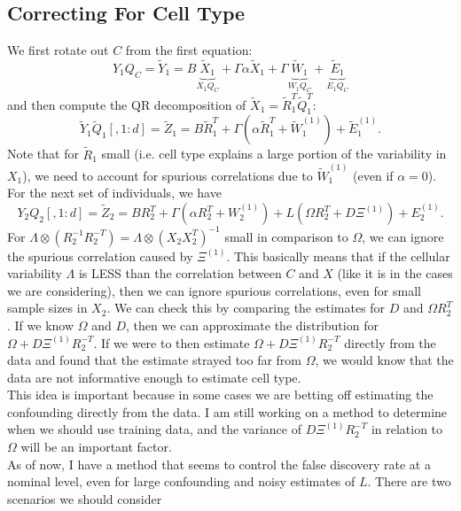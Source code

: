 \documentclass{article}
\begin{document}
\subsection*{Correcting For Cell Type}
We first rotate out $C$ from the first equation:
\[
Y_1Q_C = \tilde{Y}_1 = B\underbrace{\tilde{X}_1}_{X_1Q_C} + \Gamma \alpha \tilde{X}_1 + \Gamma \underbrace{\tilde{W}_1}_{W_1 Q_C} + \underbrace{\tilde{E}_1}_{E_1 Q_C}
\]
and then compute the QR decomposition of $\tilde{X}_1 = \tilde{R}_1^T\tilde{Q}_1^T $:
\[
\tilde{Y}_1 \tilde{Q}_1\left[ ,1:d \right] = \tilde{Z}_1 = B\tilde{R}_1^T + \Gamma \left( \alpha \tilde{R}_1^T + \tilde{W}_1^{(1)} \right) + \tilde{E}_1^{(1)}.
\]
Note that for $\tilde{R}_1$ small (i.e. cell type explains a large portion of the variability in $X_1$), we need to account for spurious correlations due to $\tilde{W}_1^{(1)}$ (even if $\alpha = 0$). For the next set of individuals, we have
\[
Y_2 Q_2\left[ ,1:d \right] = \tilde{Z}_2 = BR_2^T + \Gamma\left( \alpha R_2^T + W_2^{(1)} \right) + L\left( \Omega R_2^T + D\Xi^{(1)} \right) + E_2^{(1)}.
\]
For $\Lambda \otimes \left( R_2^{-1}R_2^{-T} \right) = \Lambda \otimes \left( X_2 X_2^T \right)^{-1}$ small in comparison to $\Omega$, we can ignore the spurious correlation caused by $\Xi^{(1)}$. This basically means that if the cellular variability $\Lambda$ is LESS than the correlation between $C$ and $X$ (like it is in the cases we are considering), then we can ignore spurious correlations, even for small sample sizes in $X_2$. We can check this by comparing the estimates for $D$ and $\Omega R_2^T$. If we know $\Omega$ and $D$, then we can approximate the distribution for $\Omega + D\Xi^{(1)}R_2^{-T}$. If we were to then estimate $\Omega + D\Xi^{(1)}R_2^{-T}$ directly from the data and found that the estimate strayed too far from $\Omega$, we would know that the data are not informative enough to estimate cell type.\\
\indent This idea is important because in some cases we are betting off estimating the confounding directly from the data. I am still working on a method to determine when we should use training data, and the variance of $D\Xi^{(1)}R_2^{-T}$ in relation to $\Omega$ will be an important factor.\\
\indent As of now, I have a method that seems to control the false discovery rate at a nominal level, even for large confounding and noisy estimates of $L$. There are two scenarios we should consider
\end{document}
